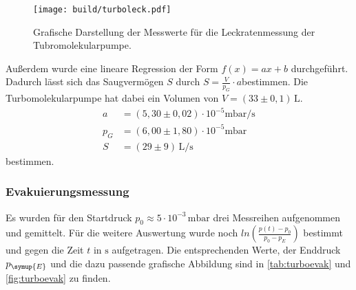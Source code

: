 \begin{figure}[H]
  \centering
  \texttt{[image: build/turboleck.pdf]}
  \caption{Grafische Darstellung der Messwerte für die Leckratenmessung der Tubromolekularpumpe.}
  \label{fig:turboleck}
\end{figure}
Außerdem wurde eine lineare Regression der Form $f(x) = ax +b$ durchgeführt. Dadurch lässt sich das Saugvermögen
$S$ durch $S = \frac{V}{p_G}\cdot a$bestimmen. Die Turbomolekularpumpe hat dabei ein Volumen von
$V = (33 \pm 0,1) \,\si{\liter}$. 
\begin{align*}
  a &= (5,30 \pm 0,02)\cdot 10^{-5} \si{\milli\bar\per\second} \\
  p_G &= (6,00 \pm 1,80) \cdot 10^{-5} \si{\milli\bar} \\
  S &= (29 \pm 9)\,\si{\liter\per\second}
\end{align*}
bestimmen.

\subsubsection{Evakuierungsmessung}
Es wurden für den Startdruck $p_{0} \approx 5\cdot 10^{-3}\,\si{\milli\bar}$ drei Messreihen aufgenommen und
gemittelt. Für die weitere Auswertung wurde noch $ln(\frac{p(t)-p_0}{p_0 - p_E})$ bestimmt und gegen die Zeit
$t$ in $\si{\second}$ aufgetragen. Die entsprechenden Werte, der Enddruck $p_{\symup{E}}$ und die dazu passende
grafische Abbildung sind in \autoref{tab:turboevak} und \autoref{fig:turboevak} zu finden.

